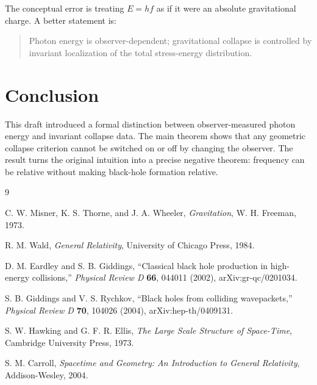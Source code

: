 \documentclass[11pt]{article}
\theoremstyle{remark}
\begin{document}
The conceptual error is treating $E=hf$ as if it were an absolute gravitational charge. A better statement is:
\begin{quote}
Photon energy is observer-dependent; gravitational collapse is controlled by invariant localization of the total stress-energy distribution.
\end{quote}

\section{Conclusion}

This draft introduced a formal distinction between observer-measured photon energy and invariant collapse data. The main theorem shows that any geometric collapse criterion cannot be switched on or off by changing the observer. The result turns the original intuition into a precise negative theorem: frequency can be relative without making black-hole formation relative.

\begin{thebibliography}{9}

C. W. Misner, K. S. Thorne, and J. A. Wheeler,
\textit{Gravitation}, W. H. Freeman, 1973.

R. M. Wald,
\textit{General Relativity}, University of Chicago Press, 1984.

D. M. Eardley and S. B. Giddings,
``Classical black hole production in high-energy collisions,''
\textit{Physical Review D} \textbf{66}, 044011 (2002), arXiv:gr-qc/0201034.

S. B. Giddings and V. S. Rychkov,
``Black holes from colliding wavepackets,''
\textit{Physical Review D} \textbf{70}, 104026 (2004), arXiv:hep-th/0409131.

S. W. Hawking and G. F. R. Ellis,
\textit{The Large Scale Structure of Space-Time}, Cambridge University Press, 1973.

S. M. Carroll,
\textit{Spacetime and Geometry: An Introduction to General Relativity}, Addison-Wesley, 2004.

\end{thebibliography}
\end{document}
